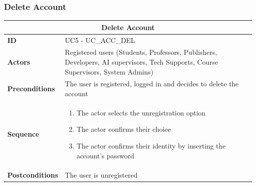 \subsubsection{Delete Account}
\begin{tabular}{|m{2.5cm}|m{8cm}|}
	\hline
	\multicolumn{2}{|c|}{Delete Account} \\
	\hline
	\textbf{ID} & UC5 - UC\_ACC\_DEL \\
	\hline
	\textbf{Actors} & Registered users (Students, Professors, Publishers, Developers, AI supervisors, Tech Supports, Course Supervisors, System Admins) \\
	\hline
	\textbf{Preconditions} & The user is registered, logged in and decides to delete the account \\
	\hline
	\textbf{Sequence} & 
	\begin{enumerate}
		\item The actor selects the unregistration option
		\item The actor confirms their choice 
		\item The actor confirms their identity by inserting the account’s password
	\end{enumerate} \\
	\hline
	\textbf{Postconditions} & The user is unregistered \\
	\hline
\end{tabular}

